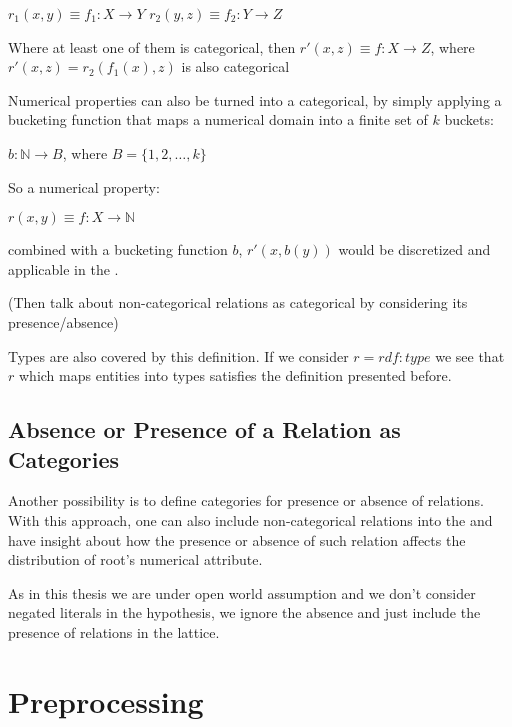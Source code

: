 $r_1(x,y) \equiv f_1 : X \rightarrow Y$ \newline
$r_2(y,z) \equiv f_2 : Y \rightarrow Z$ 

Where at least one of them is categorical, then $r'(x,z) \equiv f : X \rightarrow Z$, where $r'(x,z)=r_2(f_1(x),z)$ is also categorical


Numerical properties can also be turned into a categorical, by simply applying a bucketing function that maps a
numerical domain into a finite set of $k$ buckets:

$b: \mathbb{N} \rightarrow B$, where $B=\{1,2,\dots ,k \}$

So a numerical property:

$r(x,y) \equiv f : X \rightarrow \mathbb{N}$ 

combined with a bucketing function $b$, $r'(x,b(y))$ would be discretized and applicable in the \graphname.

(Then talk about non-categorical relations as categorical by considering its presence/absence)

Types are also covered by this definition. If we consider $r = rdf:type$ we see that $r$ which maps entities into
types satisfies the definition presented before.

\subsection{Absence or Presence of a Relation as Categories}

Another possibility is to define categories for presence or absence of relations. With this approach, one can also
include non-categorical relations into the \graphname and have insight about how the presence or absence of such
relation affects the distribution of root's numerical attribute.

As in this thesis we are under open world assumption and we don't consider negated literals in the hypothesis, we ignore
the absence and just include the presence of relations in the lattice.


%
%
%

\section{Preprocessing}

